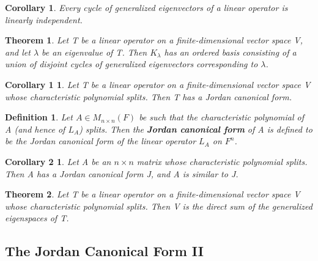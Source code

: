 \documentclass{article}
\newcommand{\bd}[1]{\textbf{#1}}
\theoremstyle{plain}
\newtheorem{theorem}{Theorem}[section]
\newtheorem*{corollary}{Corollary}
\newtheorem*{corollary1}{Corollary 1}
\newtheorem*{corollary2}{Corollary 2}
\newtheorem*{definition1}{Definition}
\theoremstyle{plain} %
\begin{document}
\begin{corollary}
  Every cycle of generalized eigenvectors of a linear operator is linearly independent.
\end{corollary}

\begin{theorem}
  Let T be a linear operator on a finite-dimensional vector space V, and let $\lambda$ be an eigenvalue of T. Then $K_\lambda$ has an ordered basis consisting of a union of disjoint cycles of generalized eigenvectors corresponding to $\lambda$.
\end{theorem}

\begin{corollary1}
  Let T be a linear operator on a finite-dimensional vector space V whose characteristic polynomial splits. Then T has a Jordan canonical form.
\end{corollary1}

\begin{definition1}
  Let $A \in M_{n\times n}(F)$ be such that the characteristic polynomial of A (and hence of $L_A$) splits. Then the \bd{Jordan canonical form} of A is defined to be the Jordan canonical form of the linear operator $L_A$ on $F^n$.
\end{definition1}

\begin{corollary2}
  Let A be an $n \times n$ matrix whose characteristic polynomial splits. Then A has a Jordan canonical form J, and A is similar to J.
\end{corollary2}

\begin{theorem}
  Let T be a linear operator on a finite-dimensional vector space V whose characteristic polynomial splits. Then V is the direct sum of the generalized eigenspaces of T.
\end{theorem}

\subsection{The Jordan Canonical Form II}

\end{document}
